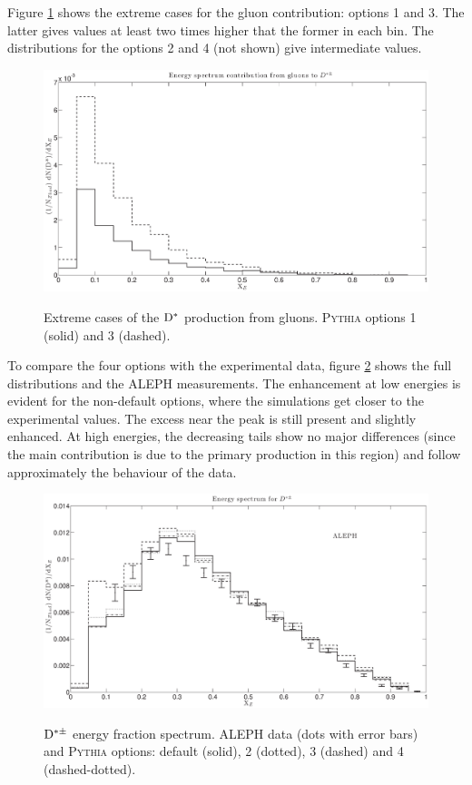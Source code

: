 \documentclass[a4paper,12pt]{article}
\begin{document}
Figure \ref{fig:GluonDStar} shows the extreme cases for the gluon contribution: options 1 and 3. The latter gives values at least two times higher that the former in each bin. The distributions for the options 2 and 4 (not shown) give intermediate values.

\begin{figure}[h]
\centering
\caption[Gluon contribution to the $\D^{*\pm}$ production in two extreme cases.]{Extreme cases of the ${\mathrm D}^*$ production from gluons. \textsc{Pythia} options 1 (solid) and 3 (dashed).}
\includegraphics[width=15cm]{GluonDStarThesis.eps}
\label{fig:GluonDStar}
\end{figure}

To compare the four options with the experimental data, figure \ref{fig:DStarOp} shows the full distributions and the ALEPH measurements. The enhancement at low energies is evident for the non-default options, where the simulations get closer to the experimental values. The excess near the peak is still present and slightly enhanced. At high energies, the decreasing tails show no major differences (since the main contribution is due to the primary production in this region) and follow approximately the behaviour of the data.

\begin{figure}[!h]
\centering
\caption[$\D^{*\pm}$ energy fraction spectrum. Simulations and data compared.]{$\D^{*\pm}$ energy fraction spectrum. ALEPH data (dots with error bars) and \textsc{Pythia} options: default (solid), 2 (dotted), 3 (dashed) and 4 (dashed-dotted).}
\includegraphics[width=15cm]{DStarOpThesis.eps}
\label{fig:DStarOp}
\end{figure}
\end{document}
